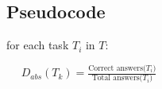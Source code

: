 \subsection{Pseudocode} \label{subsec:q1_pseudocode}

for each task $T_i$ in $T$:

\vspace{5mm}

$\quad$ $D_{abs}(T_k) = \frac{\text{Correct answers(}T_i\text{)}} {\text{Total answers(}T_i\text{)}}$